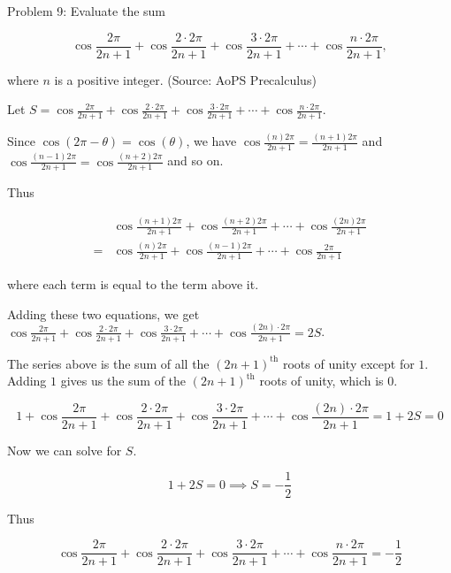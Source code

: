 Problem 9: Evaluate the sum

\[ \displaystyle \cos \frac{2\pi}{2n+1} + \cos \frac{2\cdot 2\pi}{2n+1} + \cos \frac{3\cdot 2\pi}{2n+1} + \cdots + \cos \frac{n\cdot 2\pi}{2n+1} , \]

where $n$ is a positive integer. (Source: AoPS Precalculus)

Let $\displaystyle S = \cos \frac{2\pi}{2n+1} + \cos \frac{2\cdot 2\pi}{2n+1} + \cos \frac{3\cdot 2\pi}{2n+1} + \cdots + \cos \frac{n\cdot 2\pi}{2n+1}$.

Since $\cos(2\pi - \theta) = \cos(\theta)$, we have $\displaystyle \cos \frac{(n)2\pi}{2n + 1} = \frac{(n+1)2\pi}{2n + 1}$ and $\displaystyle \cos \frac{(n-1)2\pi}{2n + 1} = \cos \frac{(n+2)2\pi}{2n + 1}$ and so on. 

Thus

\begin{align*}
&\cos \frac{(n+1)2\pi}{2n + 1} + \cos \frac{(n+2)2\pi}{2n + 1} + \cdots + \cos \frac{(2n)2\pi}{2n + 1} \\
= &\cos \frac{(n)2\pi}{2n + 1} + \cos \frac{(n-1)2\pi}{2n + 1} + \cdots + \cos \frac{2\pi}{2n + 1}
\end{align*}

where each term is equal to the term above it.

Adding these two equations, we get $\displaystyle \cos \frac{2\pi}{2n+1} + \cos \frac{2\cdot 2\pi}{2n+1} + \cos \frac{3\cdot 2\pi}{2n+1} + \cdots + \cos \frac{(2n) \cdot 2\pi}{2n+1} = 2S$.

The series above is the sum of all the $(2n+1)^{\text{th}}$ roots of unity except for $1$. Adding $1$ gives us the sum of the $(2n+1)^{\text{th}}$ roots of unity, which is $0$.

$$ 1 + \cos \frac{2\pi}{2n+1} + \cos \frac{2\cdot 2\pi}{2n+1} + \cos \frac{3\cdot 2\pi}{2n+1} + \cdots + \cos \frac{(2n) \cdot 2\pi}{2n+1} = 1 + 2S = 0 $$

Now we can solve for $S$.

$$ 1 + 2S = 0 \implies S = -\frac{1}{2} $$

Thus

$$ \boxed{\cos \frac{2\pi}{2n+1} + \cos \frac{2\cdot 2\pi}{2n+1} + \cos \frac{3\cdot 2\pi}{2n+1} + \cdots + \cos \frac{n\cdot 2\pi}{2n+1} = -\frac{1}{2}} $$
